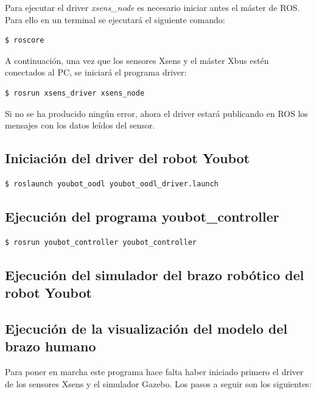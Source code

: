 \documentclass[12pt, a4paper]{report}
\begin{document}
Para ejecutar el driver \textit{xsens\_node} es necesario iniciar antes el máster de ROS. Para ello en un terminal se ejecutará el siguiente comando:

\begin{verbatim}
$ roscore
\end{verbatim}

A continuación, una vez que los sensores Xsens y el máster Xbus estén conectados al PC, se iniciará el programa driver:

\begin{verbatim}
$ rosrun xsens_driver xsens_node
\end{verbatim}

Si no se ha producido ningún error, ahora el driver estará publicando en ROS los mensajes con los datos leídos del sensor.

\subsection{Iniciación del driver del robot Youbot}

\begin{verbatim}
$ roslaunch youbot_oodl youbot_oodl_driver.launch
\end{verbatim}

\subsection{Ejecución del programa youbot\_controller}

\begin{verbatim}
$ rosrun youbot_controller youbot_controller
\end{verbatim}

\subsection{Ejecución del simulador del brazo robótico del robot Youbot}

\subsection{Ejecución de la visualización del modelo del brazo humano}

Para poner en marcha este programa hace falta haber iniciado primero el driver de los sensores Xsens y el simulador Gazebo. Los pasos a seguir son los siguientes:
\end{document}
